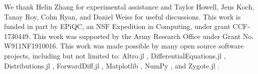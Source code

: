 \begin{acknowledgments}
  We thank Helin Zhang for experimental assistance
  and Taylor Howell, Jens Koch, Tanay Roy, Colm Ryan, and Daniel Weiss for useful discussions.
  This work is funded in part by EPiQC, an NSF Expedition in Computing, under grant CCF-1730449.
  This work was supported by the Army Research Office under Grant No. W911NF1910016.
  This work was made possible by many open source software projects,
  including but not limited to:
  Altro.jl \cite{howell2019altro},
  DifferentialEquations.jl \cite{rackauckas2017differentialequations},
  Distributions.jl \cite{besancon2019distributions},
  ForwardDiff.jl \cite{revelsLubinPapamarkou2016},
  Matplotlib \cite{hunter2007matplotlib},
  NumPy \cite{harris2020array},
  and Zygote.jl \cite{innes2018don}.
\end{acknowledgments}
